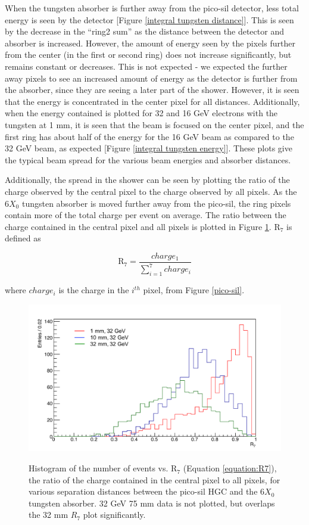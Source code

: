 \documentclass[twocolumn,aps,prd,reprint]{revtex4-1}
\begin{document}
When the tungsten absorber is further away from the pico-sil detector, less total energy is seen by the detector [Figure \ref{integral tungsten distance}]. This is seen by the decrease in the ``ring2 sum'' as the distance between the detector and absorber is increased. However, the amount of energy seen by the pixels further from the center (in the first or second ring) does not increase significantly, but remains constant or decreases. This is not expected - we expected the further away pixels to see an increased amount of energy as the detector is further from the absorber, since they are seeing a later part of the shower. However, it is seen that the energy is concentrated in the center pixel for all distances. Additionally, when the energy contained is plotted for 32 and 16 GeV electrons with the tungsten at 1 mm, it is seen that the beam is focused on the center pixel, and the first ring has about half of the energy for the 16 GeV beam as compared to the 32 GeV beam, as expected [Figure \ref{integral tungsten energy}]. These plots give the typical beam spread for the various beam energies and absorber distances.

Additionally, the spread in the shower can be seen by plotting the ratio of the charge observed by the central pixel to the charge observed by all pixels. As the $6X_0$ tungsten absorber is moved further away from the pico-sil, the ring pixels contain more of the total charge per event on average. The ratio between the charge contained in the central pixel and all pixels is plotted in Figure \ref{charge ratios}. $\mathrm{R}_7$ is defined as

\begin{equation}
\mathrm{R}_7 = \frac{charge_1}{\sum_{i=1}^7 charge_i}
\label{equation:R7}
\end{equation}

where $charge_i$ is the charge in the $i^{th}$ pixel, from Figure \ref{pico-sil}.

\begin{figure}[!htbp]
{\includegraphics[width = .5\textwidth]{center_all_ratio}} 
\caption{Histogram of the number of events vs. $\mathrm{R}_7$ (Equation \ref{equation:R7}), the ratio of the charge contained in the central pixel to all pixels, for various separation distances between the pico-sil HGC and the $6X_0$ tungsten absorber. 32 GeV 75 mm data is not plotted, but overlaps the 32 mm $R_7$ plot significantly.}
\label{charge ratios}
\end{figure}
\end{document}
